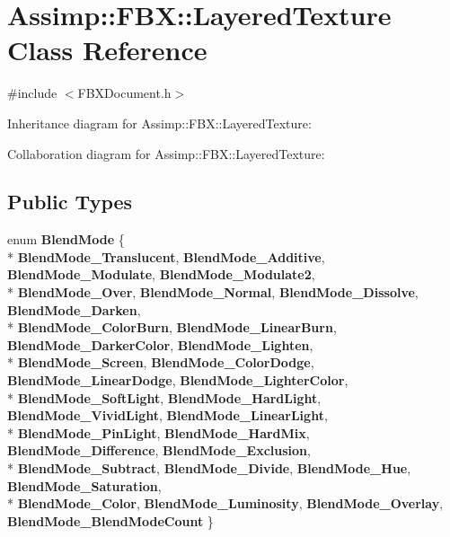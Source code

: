 \hypertarget{class_assimp_1_1_f_b_x_1_1_layered_texture}{\section{Assimp\+:\+:F\+B\+X\+:\+:Layered\+Texture Class Reference}
\label{class_assimp_1_1_f_b_x_1_1_layered_texture}
}


{\ttfamily \#include $<$F\+B\+X\+Document.\+h$>$}



Inheritance diagram for Assimp\+:\+:F\+B\+X\+:\+:Layered\+Texture\+:


Collaboration diagram for Assimp\+:\+:F\+B\+X\+:\+:Layered\+Texture\+:
\subsection*{Public Types}
\begin{DoxyCompactItemize}
\item 
\hypertarget{class_assimp_1_1_f_b_x_1_1_layered_texture_a11c7af30f3bcf84af124981f36dfcba9}{enum {\bfseries Blend\+Mode} \{ \\*
{\bfseries Blend\+Mode\+\_\+\+Translucent}, 
{\bfseries Blend\+Mode\+\_\+\+Additive}, 
{\bfseries Blend\+Mode\+\_\+\+Modulate}, 
{\bfseries Blend\+Mode\+\_\+\+Modulate2}, 
\\*
{\bfseries Blend\+Mode\+\_\+\+Over}, 
{\bfseries Blend\+Mode\+\_\+\+Normal}, 
{\bfseries Blend\+Mode\+\_\+\+Dissolve}, 
{\bfseries Blend\+Mode\+\_\+\+Darken}, 
\\*
{\bfseries Blend\+Mode\+\_\+\+Color\+Burn}, 
{\bfseries Blend\+Mode\+\_\+\+Linear\+Burn}, 
{\bfseries Blend\+Mode\+\_\+\+Darker\+Color}, 
{\bfseries Blend\+Mode\+\_\+\+Lighten}, 
\\*
{\bfseries Blend\+Mode\+\_\+\+Screen}, 
{\bfseries Blend\+Mode\+\_\+\+Color\+Dodge}, 
{\bfseries Blend\+Mode\+\_\+\+Linear\+Dodge}, 
{\bfseries Blend\+Mode\+\_\+\+Lighter\+Color}, 
\\*
{\bfseries Blend\+Mode\+\_\+\+Soft\+Light}, 
{\bfseries Blend\+Mode\+\_\+\+Hard\+Light}, 
{\bfseries Blend\+Mode\+\_\+\+Vivid\+Light}, 
{\bfseries Blend\+Mode\+\_\+\+Linear\+Light}, 
\\*
{\bfseries Blend\+Mode\+\_\+\+Pin\+Light}, 
{\bfseries Blend\+Mode\+\_\+\+Hard\+Mix}, 
{\bfseries Blend\+Mode\+\_\+\+Difference}, 
{\bfseries Blend\+Mode\+\_\+\+Exclusion}, 
\\*
{\bfseries Blend\+Mode\+\_\+\+Subtract}, 
{\bfseries Blend\+Mode\+\_\+\+Divide}, 
{\bfseries Blend\+Mode\+\_\+\+Hue}, 
{\bfseries Blend\+Mode\+\_\+\+Saturation}, 
\\*
{\bfseries Blend\+Mode\+\_\+\+Color}, 
{\bfseries Blend\+Mode\+\_\+\+Luminosity}, 
{\bfseries Blend\+Mode\+\_\+\+Overlay}, 
{\bfseries Blend\+Mode\+\_\+\+Blend\+Mode\+Count}
 \}}\label{class_assimp_1_1_f_b_x_1_1_layered_texture_a11c7af30f3bcf84af124981f36dfcba9}

\end{DoxyCompactItemize}
